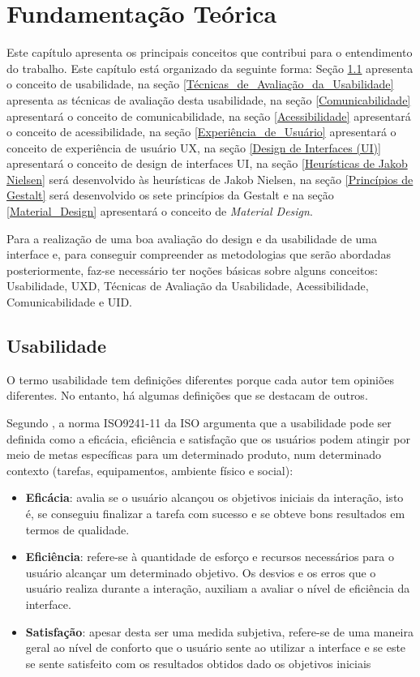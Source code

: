 \chapter[Fundamentação Teórica]{Fundamentação Teórica}
\label{capFund}

Este capítulo apresenta os principais conceitos que contribui para o entendimento do trabalho. 
Este capítulo está organizado da seguinte forma: Seção \ref{Usabilidade} apresenta o conceito de usabilidade, na seção \ref{Técnicas_de_Avaliação_da_Usabilidade} apresenta as técnicas de avaliação desta usabilidade, na seção \ref{Comunicabilidade} apresentará o conceito de comunicabilidade, na seção \ref{Acessibilidade} apresentará o conceito de acessibilidade, na seção \ref{Experiência_de_Usuário} apresentará o conceito de experiência de usuário \acs{UX}, na seção \ref{Design de Interfaces (UI)} apresentará o conceito de design de interfaces \acs{UI}, na seção \ref{Heurísticas de Jakob Nielsen} será desenvolvido às heurísticas de Jakob Nielsen, na seção \ref{Princípios de Gestalt} será desenvolvido os sete princípios da Gestalt e na seção \ref{Material_Design} apresentará o conceito de \textit{Material Design}.

Para a realização de uma boa avaliação do design e da usabilidade de uma interface e, para conseguir compreender as metodologias que serão abordadas posteriormente, faz-se necessário ter noções básicas sobre alguns conceitos: Usabilidade, \acf{UXD}, Técnicas de Avaliação da Usabilidade, Acessibilidade, Comunicabilidade e \acf{UID}.

\section{Usabilidade}
\label{Usabilidade}
O termo usabilidade tem definições diferentes porque cada autor tem opiniões diferentes. No entanto, há algumas definições que se destacam de outros.

Segundo , a norma ISO9241-11 da \ac{ISO} argumenta que a usabilidade pode ser definida como a eficácia, eficiência e satisfação que os usuários podem atingir por meio de metas específicas para um determinado produto, num determinado contexto (tarefas, equipamentos, ambiente físico e social):

\begin{itemize}
\item \textbf{Eficácia}: avalia se o usuário alcançou os objetivos iniciais da interação, isto é, se conseguiu finalizar a tarefa com sucesso e se obteve bons resultados em termos de qualidade.
\item \textbf{Eficiência}: refere-se à quantidade de esforço e recursos necessários para o usuário alcançar um determinado objetivo. Os desvios e os erros que o usuário realiza durante a interação, auxiliam a avaliar o nível de eficiência da interface.
\item \textbf{Satisfação}: apesar desta ser uma medida subjetiva, refere-se de uma maneira geral ao nível de conforto que o usuário sente ao utilizar a interface e se este se sente satisfeito com os resultados obtidos dado os objetivos iniciais
\end{itemize}

